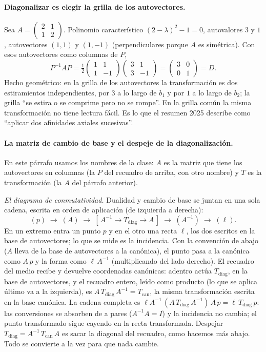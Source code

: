 \paragraph{Diagonalizar es elegir la grilla de los autovectores.} Sea
\(A=\begin{pmatrix}2&1\\1&2\end{pmatrix}\). Polinomio característico
\((2-\lambda)^2-1=0\), autovalores \(3\) y \(1\), autovectores \((1,1)\) y \((1,-1)\)
(perpendiculares porque \(A\) es simétrica). Con esos autovectores como columnas de \(P\),
\[
  P^{-1}AP=\tfrac12\begin{pmatrix}1&1\\1&-1\end{pmatrix}
  \begin{pmatrix}3&1\\3&-1\end{pmatrix}
  =\begin{pmatrix}3&0\\0&1\end{pmatrix}=D .
\]
Hecho geométrico: en la grilla de los autovectores la transformación es dos estiramientos
independientes, por \(3\) a lo largo de \(b_1\) y por \(1\) a lo largo de \(b_2\); la grilla
``se estira o se comprime pero no se rompe''. En la grilla común la misma transformación
no tiene lectura fácil. Es lo que el resumen 2025 describe como ``aplicar dos afinidades
axiales sucesivas''.

\paragraph{La matriz de cambio de base y el despeje de la diagonalización.} En este
párrafo usamos los nombres de la clase: \(A\) es la matriz que tiene los autovectores en
columnas (la \(P\) del recuadro de arriba, con otro nombre) y \(T\) es la transformación
(la \(A\) del párrafo anterior).

\emph{El diagrama de conmutatividad.} Dualidad y cambio de base se juntan en una sola
cadena, escrita en orden de aplicación (de izquierda a derecha):
\[
  (p)\;\to\;(A)\;\to\;[\,A^{-1}\to T_{\mathrm{diag}}\to A\,]\;\to\;(A^{-1})\;\to\;(\ell) .
\]
En un extremo entra un punto \(p\) y en el otro una recta \(\ell\), los dos escritos en la
base de autovectores; lo que se mide es la incidencia. Con la convención de abajo (\(A\)
lleva de la base de autovectores a la canónica), el punto pasa a la canónica como \(A\,p\)
y la forma como \(\ell\,A^{-1}\) (multiplicando del lado derecho). El recuadro del medio
recibe y devuelve coordenadas canónicas: adentro actúa \(T_{\mathrm{diag}}\), en la base
de autovectores, y el recuadro entero, leído como producto (lo que se aplica último va a la
izquierda), es \(A\,T_{\mathrm{diag}}\,A^{-1}=T_{\mathrm{can}}\), la misma transformación
escrita en la base canónica. La cadena completa es
\(\ell A^{-1}\,(A\,T_{\mathrm{diag}}\,A^{-1})\,A\,p=\ell\,T_{\mathrm{diag}}\,p\): las
conversiones se absorben de a pares (\(A^{-1}A=I\)) y la incidencia no cambia; el punto
transformado sigue cayendo en la recta transformada. Despejar
\(T_{\mathrm{diag}}=A^{-1}\,T_{\mathrm{can}}\,A\) es sacar la diagonal del recuadro, como
hacemos más abajo. Todo se convierte a la vez para que nada cambie.

